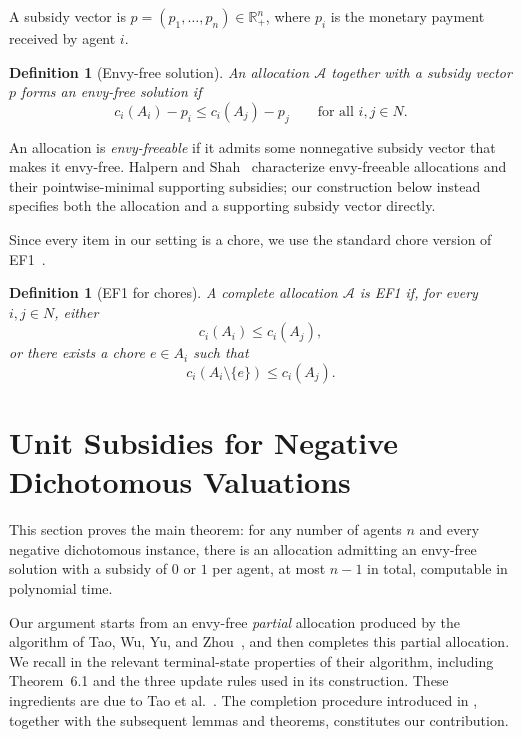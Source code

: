 \documentclass[sigconf,anonymous]{aamas}
\newcommand{\agents}{N}
\newcommand{\alloc}{\mathcal{A}}
\newcommand{\bundle}[1]{A_{#1}}
\newcommand{\subsidy}{p}
\newcommand{\cost}{c}
\theoremstyle{acmplain}
\theoremstyle{acmdefinition}
\newtheorem{definition}[theorem]{Definition}
\theoremstyle{acmplain}
\begin{document}
A subsidy vector is $p=(p_1,\ldots,p_n)\in\mathbb R_+^n$, where $p_i$ is the monetary payment received by agent $i$.

\begin{definition}[Envy-free solution]
\label{def:efsolution}
An allocation $\alloc$ together with a subsidy vector $\subsidy$
forms an \emph{envy-free solution} if
\[
\cost_i(\bundle{i})-\subsidy_i
\le
\cost_i(\bundle{j})-\subsidy_j
\qquad\text{for all }i,j\in\agents.
\]
\end{definition}

An allocation is \emph{envy-freeable} if it admits some
nonnegative subsidy vector that makes it envy-free. Halpern and
Shah~\cite{HS19} characterize envy-freeable allocations and their
pointwise-minimal supporting subsidies; our construction below
instead specifies both the allocation and a supporting subsidy
vector directly.

Since every item in our setting is a chore, we use the standard chore version of EF1~\cite{aziz2019fair}.

\begin{definition}[EF1 for chores]
\label{def:ef1}
\label{def:ef1chores}
A complete allocation $\alloc$ is \emph{EF1} if, for every $i,j\in\agents$, either
\[
\cost_i(\bundle{i})\le \cost_i(\bundle{j}),
\]
or there exists a chore $e\in\bundle{i}$ such that
\[
\cost_i(\bundle{i}\setminus\{e\})
\le
\cost_i(\bundle{j}).
\]
\end{definition}

\section{Unit Subsidies for Negative Dichotomous Valuations}
\label{sec:main}

This section proves the main theorem: for any number of agents $n$ and every negative dichotomous instance, there is an allocation admitting an envy-free solution with a subsidy of $0$ or $1$ per agent, at most $n-1$ in total, computable in polynomial time. 


Our argument starts from an envy-free \emph{partial} allocation produced by the algorithm of Tao, Wu, Yu, and Zhou~\cite{tao2025existence}, and then completes this partial allocation. We recall in  the relevant terminal-state properties of their algorithm, including Theorem~6.1 and the three update rules used in its construction. These ingredients are due to Tao et al.~\cite{tao2025existence}. The completion procedure introduced in , together with the subsequent lemmas and theorems, constitutes our contribution.
\end{document}
